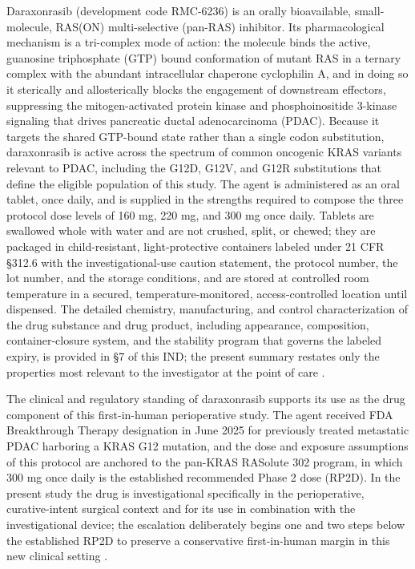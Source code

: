 Daraxonrasib (development code RMC-6236) is an orally bioavailable, small-molecule,
RAS(ON) multi-selective (pan-RAS) inhibitor. Its pharmacological mechanism is a
tri-complex mode of action: the molecule binds the active, guanosine triphosphate
(GTP) bound conformation of mutant RAS in a ternary complex with the abundant
intracellular chaperone cyclophilin A, and in doing so it sterically and
allosterically blocks the engagement of downstream effectors, suppressing the
mitogen-activated protein kinase and phosphoinositide 3-kinase signaling that
drives pancreatic ductal adenocarcinoma (PDAC). Because it targets the shared
GTP-bound state rather than a single codon substitution, daraxonrasib is active
across the spectrum of common oncogenic KRAS variants relevant to PDAC, including
the G12D, G12V, and G12R substitutions that define the eligible population of this
study. The agent is administered as an oral tablet, once daily, and is supplied in
the strengths required to compose the three protocol dose levels of 160 mg, 220 mg,
and 300 mg once daily. Tablets are swallowed whole with water and are not crushed,
split, or chewed; they are packaged in child-resistant, light-protective containers
labeled under 21 CFR \S 312.6 with the investigational-use caution statement,
the protocol number, the lot number, and the storage conditions, and are stored at
controlled room temperature in a secured, temperature-monitored,
access-controlled location until dispensed. The detailed chemistry, manufacturing,
and control characterization of the drug substance and drug product, including
appearance, composition, container-closure system, and the stability program that
governs the labeled expiry, is provided in \S 7 of this IND; the present summary
restates only the properties most relevant to the investigator at the point of
care \cite{daraxwhipple,pdac060s2030}.

The clinical and regulatory standing of daraxonrasib supports its use as the drug
component of this first-in-human perioperative study. The agent received FDA
Breakthrough Therapy designation in June 2025 for previously treated metastatic
PDAC harboring a KRAS G12 mutation, and the dose and exposure assumptions of this
protocol are anchored to the pan-KRAS RASolute 302 program, in which 300 mg once
daily is the established recommended Phase 2 dose (RP2D). In the present study the
drug is investigational specifically in the perioperative, curative-intent
surgical context and for its use in combination with the investigational device;
the escalation deliberately begins one and two steps below the established RP2D to
preserve a conservative first-in-human margin in this new clinical setting
\cite{daraxwhipple,natlpaiplatf}.

